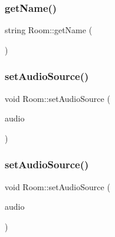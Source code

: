 \subsubsection{\texorpdfstring{get\+Name()}{getName()}\hspace{0.1cm}{\footnotesize\ttfamily [2/2]}}
{\footnotesize\ttfamily string Room\+::get\+Name (\begin{DoxyParamCaption}{ }\end{DoxyParamCaption})\hspace{0.3cm}{\ttfamily [inline]}}

\mbox{\label{class_room_ae51a48335bf154e1194c1acc2fa16813}} 
\subsubsection{\texorpdfstring{set\+Audio\+Source()}{setAudioSource()}\hspace{0.1cm}{\footnotesize\ttfamily [1/2]}}
{\footnotesize\ttfamily void Room\+::set\+Audio\+Source (\begin{DoxyParamCaption}\item[{\hyperlink{struct_audio_source}{Audio\+Source}}]{audio }\end{DoxyParamCaption})\hspace{0.3cm}{\ttfamily [inline]}}

\mbox{\label{class_room_ae51a48335bf154e1194c1acc2fa16813}} 
\subsubsection{\texorpdfstring{set\+Audio\+Source()}{setAudioSource()}\hspace{0.1cm}{\footnotesize\ttfamily [2/2]}}
{\footnotesize\ttfamily void Room\+::set\+Audio\+Source (\begin{DoxyParamCaption}\item[{\hyperlink{struct_audio_source}{Audio\+Source}}]{audio }\end{DoxyParamCaption})\hspace{0.3cm}{\ttfamily [inline]}}

\mbox{\label{class_room_ae105a370ebb1cdded2254d39c547a5fd}} 
